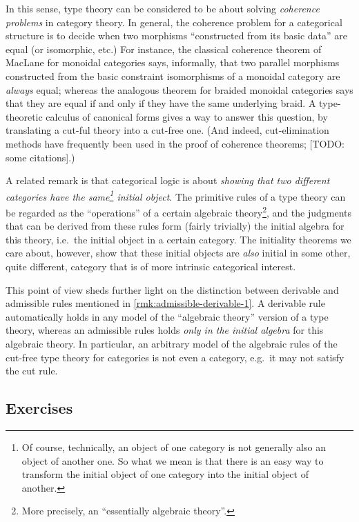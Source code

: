 \documentclass{book}
\begin{document}
In this sense, type theory can be considered to be about solving \emph{coherence problems} in category theory.
In general, the coherence problem for a categorical structure is to decide when two morphisms ``constructed from its basic data'' are equal (or isomorphic, etc.)
For instance, the classical coherence theorem of MacLane for monoidal categories says, informally, that two parallel morphisms constructed from the basic constraint isomorphisms of a monoidal category are \emph{always} equal; whereas the analogous theorem for braided monoidal categories says that they are equal if and only if they have the same underlying braid.
A type-theoretic calculus of canonical forms gives a way to answer this question, by translating a cut-ful theory into a cut-free one.
(And indeed, cut-elimination methods have frequently been used in the proof of coherence theorems; [TODO: some citations].)

A related remark is that categorical logic is about \emph{showing that two different categories have the same\footnote{Of course, technically, an object of one category is not generally also an object of another one.  So what we mean is that there is an easy way to transform the initial object of one category into the initial object of another.} initial object}.
The primitive rules of a type theory can be regarded as the ``operations'' of a certain algebraic theory\footnote{More precisely, an ``essentially algebraic theory''.}, and the judgments that can be derived from these rules form (fairly trivially) the initial algebra for this theory, i.e.\ the initial object in a certain category.
The initiality theorems we care about, however, show that these initial objects are \emph{also} initial in some other, quite different, category that is of more intrinsic categorical interest.

\begin{rmk}\label{rmk:admissible-derivable-2}
  This point of view sheds further light on the distinction between derivable and admissible rules mentioned in \cref{rmk:admissible-derivable-1}.
  A derivable rule automatically holds in any model of the ``algebraic theory'' version of a type theory, whereas an admissible rules holds \emph{only in the initial algebra} for this algebraic theory.
  In particular, an arbitrary model of the algebraic rules of the cut-free type theory for categories is not even a category, e.g.\ it may not satisfy the cut rule.
\end{rmk}


\subsection*{Exercises}
\end{document}
